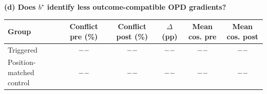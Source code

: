 \begin{table}[t]
\vspace{4pt}
\begin{minipage}[t]{0.94\textwidth}
\centering
\textbf{(d) Does $b^\star$ identify less outcome-compatible OPD gradients?}\\[-2pt]
\scriptsize
\setlength{\tabcolsep}{5.0pt}
\renewcommand{\arraystretch}{0.92}
\begin{tabular}{@{}lccccc@{}}
\hline
\textbf{Group} & \textbf{Conflict pre (\%)} & \textbf{Conflict post (\%)} & \textbf{$\Delta$ (pp)} & \textbf{Mean cos. pre} & \textbf{Mean cos. post} \\
\hline
Triggered & $--$ & $--$ & $--$ & $--$ & $--$ \\
Position-matched control & $--$ & $--$ & $--$ & $--$ & $--$ \\
\hline
\end{tabular}
\end{minipage}
\end{table}
